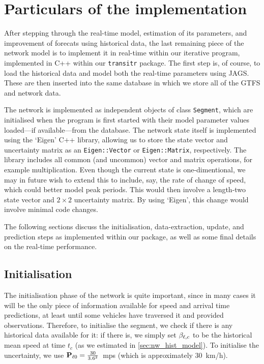 \section{Particulars of the \rt{} implementation}
\label{sec:nw_implementation}

After stepping through the real-time model, estimation of its parameters, and improvement of forecats using historical data, the last remaining piece of the network model is to implement it in real-time within our iterative program, implemented in C++ within our \verb+transitr+ package. The first step is, of course, to load the historical data and model both the real-time parameters using JAGS. These are then inserted into the same database in which we store all of the GTFS and network data.


The network is implemented as independent objects of class \verb+Segment+, which are initialised when the program is first started with their model parameter values loaded---if available---from the database. The network state itself is implemented using the `Eigen' C++ library, allowing us to store the state vector and uncertainty matrix as an \verb+Eigen::Vector+ or \verb+Eigen::Matrix+, respectively. The library includes all common (and uncommon) vector and matrix operations, for example multiplication. Even though the current state is one-dimentional, we may in future wish to extend this to include, say, the rate of change of speed, which could better model peak periods. This would then involve a length-two state vector and $2\times2$ uncertainty matrix. By using `Eigen', this change would involve minimal code changes.


The following sections discuss the initialisation, data-extraction, update, and prediction steps as implemented within our package, as well as some final details on the real-time performance.


\subsection{Initialisation}
\label{sec:nw_implementation_init}

The initialisation phase of the network is quite important, since in many cases it will be the only piece of information available for speed and arrival time predictions, at least until some vehicles have traversed it and provided observations. Therefore, to initialise the segment, we check if there is any historical data available for it: if there is, we simply set $\beta_{\ell,c}$ to be the historical mean speed at time $t_c$ (as we estimated in \cref{sec:nw_hist_model}). To initialise the uncertainty, we use $\mathbf{P}_{\ell 0} = \frac{30}{3.6^2}$~\gls{mps} (which is approximately 30~km/h).

